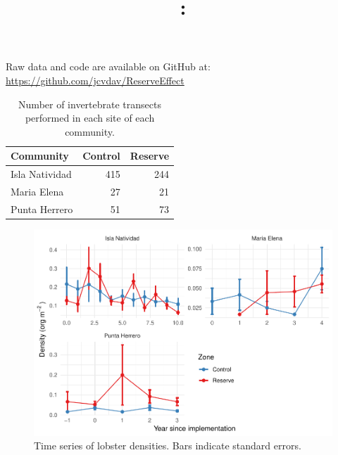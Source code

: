 \documentclass[utf8]{frontiers_suppmat} %
\begin{document}
\onecolumn
{}

\title[Supplementary Material]{{}:
\\ } %


\maketitle


Raw data and code are available on GitHub at: \url{https://github.com/jcvdav/ReserveEffect}

\begin{table}[t]

\caption{\label{tab:unnamed-chunk-2}Number of invertebrate transects performed in each site of each community.}
\centering
\begin{tabular}{lrr}
\toprule
Community & Control & Reserve\\
\midrule
Isla Natividad & 415 & 244\\
Maria Elena & 27 & 21\\
Punta Herrero & 51 & 73\\
\bottomrule
\end{tabular}
\end{table}

\begin{figure}
\centering
\includegraphics{SupplementaryMaterial_files/figure-latex/unnamed-chunk-3-1.pdf}
\caption{\label{fig:unnamed-chunk-3}Time series of lobster densities. Bars indicate standard errors.}
\end{figure}
\end{document}
